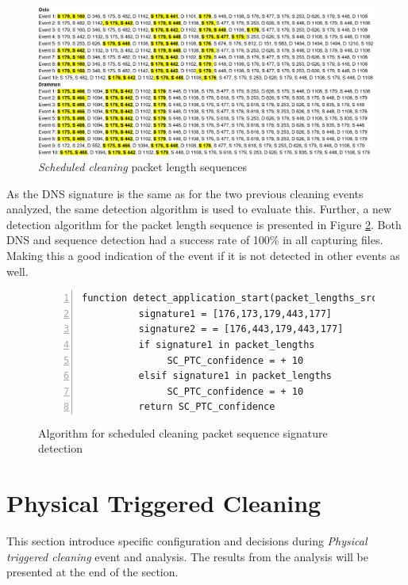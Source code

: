 \begin{figure}[H]
    \centering
    \includegraphics[width=\textwidth]{figures/Sequence_SC.png}
    \caption{\textit{Scheduled cleaning} packet length sequences}
    \label{fig:Scseq}
\end{figure}

As the \gls{DNS} signature is the same as for the two previous cleaning events analyzed, the same detection algorithm is used to evaluate this. Further, a new detection algorithm for the packet length sequence is presented in Figure \ref{fig:Sudo_code_SC_or_PC}. Both \gls{DNS} and sequence detection had a success rate of 100\% in all capturing files. Making this a good indication of the event if it is not detected in other events as well. 

\begin{figure}[H]
    \centering
    \begin{lstlisting}[numbers=left]
     function detect_application_start(packet_lengths_src)
          signature1 = [176,173,179,443,177]
          signature2 = = [176,443,179,443,177]
          if signature1 in packet_lengths
               SC_PTC_confidence = + 10
          elsif signature1 in packet_lengths
               SC_PTC_confidence = + 10
          return SC_PTC_confidence
    \end{lstlisting}
    \caption{Algorithm for scheduled cleaning packet sequence signature detection}
    \label{fig:Sudo_code_SC_or_PC}
\end{figure}


\section{Physical Triggered Cleaning}
This section introduce specific configuration and decisions during \textit{Physical triggered cleaning} event and analysis. The results from the analysis will be presented at the end of the section.

